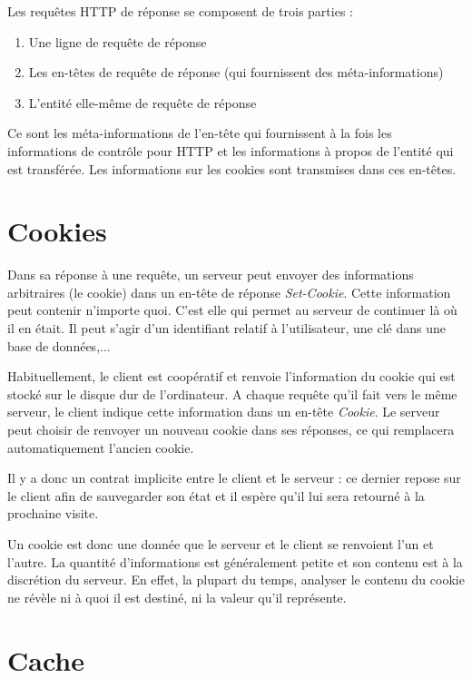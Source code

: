 \documentclass[a4paper,12pt,french]{report}
\begin{document}
		Les requêtes HTTP de réponse se composent de trois parties :
		\begin{enumerate}
			\item Une ligne de requête de réponse
			\item Les en-têtes de requête de réponse (qui fournissent des méta-informations)
			\item L'entité elle-même de requête de réponse
		\end{enumerate}
		
		Ce sont les méta-informations de l'en-tête qui fournissent à la fois les informations de contrôle pour HTTP et les informations à propos de l'entité qui est transférée. Les informations sur les cookies sont transmises dans ces en-têtes.
		
	\section{Cookies}
		Dans sa réponse à une requête, un serveur peut envoyer des informations arbitraires (le cookie) dans un en-tête de réponse \textit{Set-Cookie}. Cette information peut contenir n'importe quoi. C'est elle qui permet au serveur de continuer là où il en était. Il peut s'agir d'un identifiant relatif à l'utilisateur, une clé dans une base de données,...
		
		Habituellement, le client est coopératif et renvoie l'information du cookie qui est stocké sur le disque dur de l'ordinateur. A chaque requête qu'il fait vers le même serveur, le client indique cette information dans un en-tête \textit{Cookie}. Le serveur peut choisir de renvoyer un nouveau cookie dans ses réponses, ce qui remplacera automatiquement l'ancien cookie.
		
		Il y a donc un contrat implicite entre le client et le serveur : ce dernier repose sur le client afin de sauvegarder son état et il espère qu'il lui sera retourné à la prochaine visite.
		
		Un cookie est donc une donnée que le serveur et le client se renvoient l'un et l'autre. La quantité d'informations est généralement petite et son contenu est à la discrétion du serveur. En effet, la plupart du temps, analyser le contenu du cookie ne révèle ni à quoi il est destiné, ni la valeur qu'il représente.
		
	\section{Cache}
		
\end{document}
